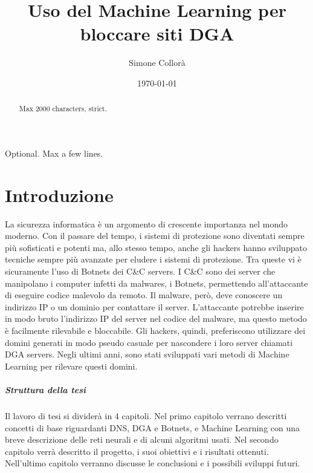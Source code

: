 \documentclass[12pt,a4paper,openright,twoside]{book}
\title{Uso del Machine Learning per bloccare siti DGA}
\author{Simone Collorà}
\date{\today}
\begin{document}
\frontmatter\frontispiece
\nocite{*}

\begin{abstract}	
Max 2000 characters, strict.
\end{abstract}

\begin{dedication} %
Optional. Max a few lines.
\end{dedication}

\tableofcontents   
\listoffigures     %
\lstlistoflistings %

\mainmatter

\chapter{Introduzione}
\label{chap:introduction}

La sicurezza informatica è un argomento di crescente importanza
nel mondo moderno. Con il passare del tempo,
i sistemi di protezione sono diventati sempre più sofisticati
e potenti ma, allo stesso tempo, anche gli hackers 
hanno sviluppato tecniche sempre più avanzate per eludere i sistemi di protezione.
Tra queste vi è sicuramente l'uso di Botnets
dei \acrfull{C&C} servers. I \acrshort{C&C} sono dei server che manipolano
i computer infetti da malwares, i Botnets, permettendo
all'attaccante di eseguire codice malevolo da remoto.
Il malware, però, deve conoscere un indirizzo IP o un dominio
per contattare il server. L'attaccante potrebbe
inserire in modo bruto l'indirizzo IP del server nel codice del malware,
ma questo metodo è facilmente rilevabile e bloccabile.
Gli hackers, quindi, preferiscono utilizzare dei domini
generati in modo pseudo casuale per nascondere i loro server chiamati
\acrfull{DGA} servers. Negli ultimi anni, sono stati sviluppati
vari metodi di Machine Learning per rilevare questi domini.



\paragraph{Struttura della tesi}
Il lavoro di tesi si dividerà in 4 capitoli. Nel primo
capitolo verrano descritti concetti di base riguardanti DNS, \acrshort{DGA} e Botnets,
e Machine Learning con una breve descrizione delle reti neurali e di alcuni
algoritmi usati. Nel secondo capitolo verrà descritto il progetto,
i suoi obiettivi e i risultati ottenuti. Nell'ultimo capitolo
verranno discusse le conclusioni e i possibili sviluppi futuri.
\end{document}
